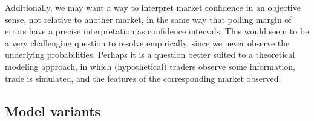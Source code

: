 \documentclass[sigconf,anonymous]{aamas}   %
\begin{document}
Additionally, we may want a way to interpret market confidence in an objective sense, not relative to another market, in the same way that polling margin of errors have a precise interpretation as confidence intervals. This would seem to be a very challenging question to resolve empirically, since we never observe the underlying probabilities. Perhaps it is a question better suited to a theoretical modeling approach, in which (hypothetical) traders observe some information, trade is simulated, and the features of the corresponding market observed.




\subsection{Model variants}
\end{document}

